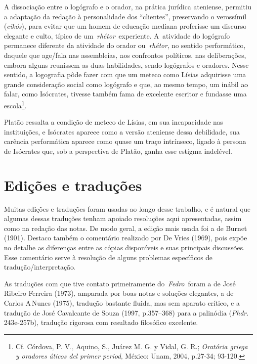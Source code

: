 A dissociação entre o logógrafo e o orador, na prática jurídica
ateniense, permitiu a adaptação da redação à personalidade dos
``clientes'', preservando o verossímil (\emph{eikós}), para evitar que
um homem de educação mediana proferisse um discurso elegante e culto,
típico de um~\emph{rhétor}~experiente. A~atividade do logógrafo
permanece diferente da atividade do orador ou~\emph{rhétor}, no sentido
performático, daquele que age/\allowbreak{}fala nas assembleias, nos confrontos
políticos, nas deliberações, embora alguns reunissem as duas
habilidades, sendo logógrafos e oradores. Nesse sentido, a logografia
pôde fazer com que um meteco como Lísias adquirisse uma grande
consideração social como logógrafo e que, ao mesmo tempo, um inábil ao
falar, como Isócrates, tivesse também fama de excelente escritor e
fundasse uma escola\footnote{Cf. Córdova, P. V., Aquino, S., Juárez M.
  G. y Vidal, G. R.; \emph{Oratória griega y oradores áticos del primer
  period}, México: Unam, 2004, p.27-34; 93-120.}.

Platão ressalta a condição de meteco de Lísias, em sua incapacidade nas
instituições, e Isócrates aparece como a versão ateniense dessa
debilidade, sua carência performática aparece como quase um traço
intrínseco, ligado à persona de Isócrates que, sob a perspectiva de
Platão, ganha esse estigma indelével.

 

\section{Edições e traduções}

 

Muitas edições e traduções foram usadas ao longo desse trabalho, e é
natural que algumas dessas traduções tenham apoiado resoluções aqui
apresentadas, assim como na redação das notas. De modo geral, a edição
mais usada foi a de Burnet (1901). Destaco também o comentário realizado
por De Vries (1969), pois expõe no detalhe as diferenças entre as cópias
disponíveis e suas principais discussões. Esse comentário serve à
resolução de alguns problemas específicos de tradução/\allowbreak{}interpretação.

As traduções com que tive contato primeiramente do~\emph{Fedro}~foram a de
José Ribeiro Ferreira (1973), amparada por boas notas e soluções
elegantes, a de Carlos A\,Nunes (1975), tradução bastante fluida, mas
sem aparato crítico, e a tradução de José Cavalcante de Souza (1997,
p.357--368) para a palinódia (\emph{Phdr}. 243e-257b), tradução rigorosa
com resultado filosófico excelente.

